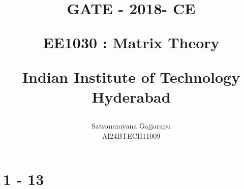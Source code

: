 \documentclass[journal]{IEEEtran}
\begin{document}

\vspace{3cm}




\title{
GATE - 2018- CE

\large{EE1030 : Matrix Theory}

Indian Institute of Technology Hyderabad
}
\author{Satyanarayana Gajjarapu

AI24BTECH11009
}	





\maketitle




\bigskip

\renewcommand{\thefigure}{\theenumi}
\renewcommand{\thetable}{\theenumi}


\section{1 - 13}
\end{document}
